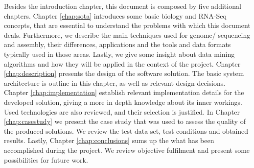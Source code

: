 
Besides the introduction chapter, this document is composed by five additional
chapters. Chapter \ref{chap:sota} introduces some basic biology and RNA-Seq
concepts, that are essential to understand the problems with which this document
deals. Furthermore, we describe the main techniques used for genome/\trans{}
sequencing and assembly, their differences, applications and the tools and data
formats typically used in those areas. Lastly, we give some insight about data
mining algorithms and how they will be applied in the context of the project.
Chapter \ref{chap:description} presents the design of the software solution. The
basic system architecture is outline in this chapter, as well as relevant design
decisions. Chapter \ref{chap:implementation} establish relevant implementation
details for the developed solution, giving a more in depth knowledge about its
inner workings. Used technologies are also reviewed, and their selection is
justified. In Chapter \ref{chap:casestudy} we present the case study that was
used to assess the quality of the produced solutions. We review the test data
set, test conditions and obtained results. Lastly, Chapter
\ref{chap:conclusions} sums up the what has been accomplished during the
project. We review objective fulfilment and present some possibilities for
future work.
